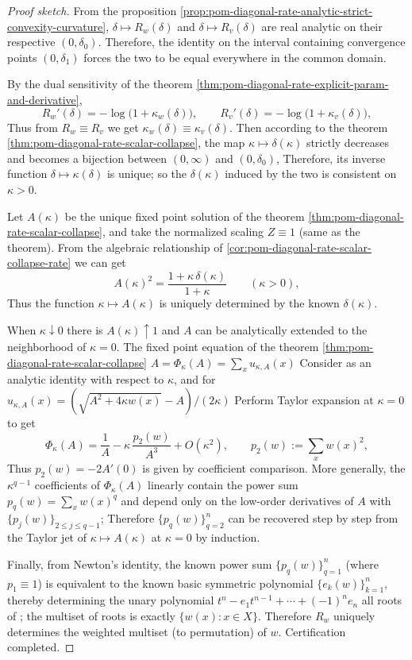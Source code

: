 \begin{proof}[Proof sketch]
From the proposition \ref{prop:pom-diagonal-rate-analytic-strict-convexity-curvature}, \(\delta\mapsto R_w(\delta)\) and \(\delta\mapsto R_v(\delta)\) are real analytic on their respective \((0,\delta_0)\).
Therefore, the identity on the interval containing convergence points \((0,\delta_1)\) forces the two to be equal everywhere in the common domain.
\par
By the dual sensitivity of the theorem \ref{thm:pom-diagonal-rate-explicit-param-and-derivative},
\[
R_w'(\delta)=-\log\bigl(1+\kappa_w(\delta)\bigr),
\qquad
R_v'(\delta)=-\log\bigl(1+\kappa_v(\delta)\bigr),
\]
Thus from \(R_w\equiv R_v\) we get \(\kappa_w(\delta)\equiv \kappa_v(\delta)\).
Then according to the theorem \ref{thm:pom-diagonal-rate-scalar-collapse}, the map \(\kappa\mapsto\delta(\kappa)\) strictly decreases and becomes a bijection between \((0,\infty)\) and \((0,\delta_0)\),
Therefore, its inverse function \(\delta\mapsto \kappa(\delta)\) is unique; so the \(\delta(\kappa)\) induced by the two is consistent on \(\kappa>0\).
\par
Let \(A(\kappa)\) be the unique fixed point solution of the theorem \ref{thm:pom-diagonal-rate-scalar-collapse}, and take the normalized scaling \(Z\equiv 1\) (same as the theorem).
From the algebraic relationship of \ref{cor:pom-diagonal-rate-scalar-collapse-rate} we can get
\[
A(\kappa)^2=\frac{1+\kappa\,\delta(\kappa)}{1+\kappa}\qquad(\kappa>0),
\]
Thus the function \(\kappa\mapsto A(\kappa)\) is uniquely determined by the known \(\delta(\kappa)\).
\par
When \(\kappa\downarrow 0\) there is \(A(\kappa)\uparrow 1\) and \(A\) can be analytically extended to the neighborhood of \(\kappa=0\).
The fixed point equation of the theorem \ref{thm:pom-diagonal-rate-scalar-collapse}
\(
A=\Phi_\kappa(A)=\sum_x u_{\kappa,A}(x)
\)
Consider as an analytic identity with respect to \(\kappa\), and for
\(
u_{\kappa,A}(x)=(\sqrt{A^2+4\kappa w(x)}-A)/(2\kappa)
\)
Perform Taylor expansion at \(\kappa=0\) to get
\[
\Phi_\kappa(A)=\frac{1}{A}-\kappa\,\frac{p_2(w)}{A^3}+O(\kappa^2),
\qquad p_2(w):=\sum_x w(x)^2,
\]
Thus \(p_2(w)=-2A'(0)\) is given by coefficient comparison.
More generally, the \(\kappa^{q-1}\) coefficients of \(\Phi_\kappa(A)\) linearly contain the power sum \(p_q(w)=\sum_x w(x)^q\) and depend only on the low-order derivatives of \(A\) with \(\{p_j(w)\}_{2\le j\le q-1}\);
Therefore \(\{p_q(w)\}_{q=2}^{n}\) can be recovered step by step from the Taylor jet of \(\kappa\mapsto A(\kappa)\) at \(\kappa=0\) by induction.
\par
Finally, from Newton's identity, the known power sum \(\{p_q(w)\}_{q=1}^{n}\) (where \(p_1\equiv 1\)) is equivalent to the known basic symmetric polynomial \(\{e_k(w)\}_{k=1}^{n}\), thereby determining the unary polynomial
\(
t^n-e_1 t^{n-1}+\cdots+(-1)^n e_n
\)
all roots of ; the multiset of roots is exactly \(\{w(x):x\in X\}\).
Therefore \(R_w\) uniquely determines the weighted multiset (to permutation) of \(w\). Certification completed.
\end{proof}

